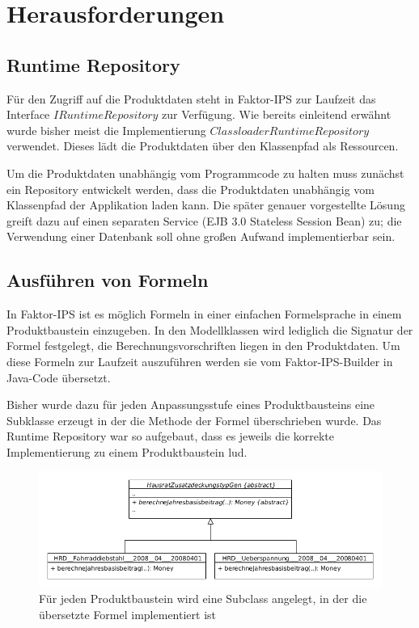 \documentclass[headsepline=true, footsepline=true]{scrartcl}
\begin{document}
\section{Herausforderungen}

\subsection{Runtime Repository}

Für den Zugriff auf die Produktdaten steht in Faktor-IPS zur Laufzeit das
Interface $IRuntimeRepository$ zur Verfügung. Wie bereits einleitend erwähnt
wurde bisher meist die Implementierung $ClassloaderRuntimeRepository$ verwendet.
Dieses lädt die Produktdaten über den Klassenpfad als Ressourcen.

Um die Produktdaten unabhängig vom Programmcode zu halten muss zunächst ein
Repository entwickelt werden, dass die Produktdaten unabhängig vom Klassenpfad
der Applikation laden kann. Die später genauer vorgestellte Lösung greift dazu
auf einen separaten Service (EJB 3.0 Stateless Session Bean) zu; die Verwendung
einer Datenbank soll ohne großen Aufwand implementierbar sein.

\subsection{Ausführen von Formeln}

In Faktor-IPS ist es möglich Formeln in einer einfachen Formelsprache in einem
Produktbaustein einzugeben. In den Modellklassen wird lediglich die Signatur der
Formel festgelegt, die Berechnungsvorschriften liegen in den Produktdaten. Um
diese Formeln zur Laufzeit auszuführen werden sie vom Faktor-IPS-Builder in
Java-Code übersetzt.

Bisher wurde dazu für jeden Anpassungsstufe eines Produktbausteins eine Subklasse
erzeugt in der die Methode der Formel überschrieben wurde. Das Runtime Repository
war so aufgebaut, dass es jeweils die korrekte Implementierung zu einem
Produktbaustein lud.

\begin{figure}[htb] \centering
\includegraphics[width=13cm]{./pics/subclassing.png} \caption{Für jeden
Produktbaustein wird eine Subclass angelegt, in der die übersetzte Formel
implementiert ist}
\label{subclassing}
\end{figure}
\end{document}
